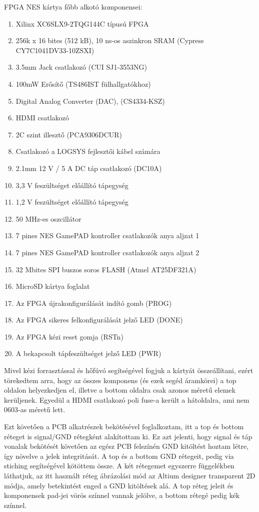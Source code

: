 	FPGA NES kártya főbb alkotó komponensei:
	\begin{enumerate}
		\item Xilinx XC6SLX9-2TQG144C típusú FPGA
		\item 256k x 16 bites (512 kB), 10 ns-os aszinkron SRAM (Cypress CY7C1041DV33-10ZSXI)
		\item 3.5mm Jack csatlakozó (CUI SJ1-3553NG)
		\item 100mW Erősítő (TS486IST fülhallgatókhoz)
		\item Digital Analog Converter (DAC), (CS4334-KSZ)
		\item HDMI csatlakozó
		\item 2C szint illesztő (PCA9306DCUR)
		\item Csatlakozó a LOGSYS fejlesztői kábel számára
		\item 2.1mm 12 V / 5 A DC táp csatlakozó (DC10A)
		\item 3,3 V feszültséget előállító tápegység
		\item 1,2 V feszültséget előállító tápegység
		\item 50 MHz-es oszcillátor 
		\item 7 pines NES GamePAD kontroller csatlakozók anya aljzat 1
		\item 7 pines NES GamePAD kontroller csatlakozók anya aljzat 2
		\item 32 Mbites SPI buszos soros FLASH (Atmel AT25DF321A)
		\item MicroSD kártya foglalat
		\item Az FPGA újrakonfigurálását indító gomb (PROG)
		\item Az FPGA sikeres felkonfigurálását jelző LED (DONE)
		\item Az FPGA kézi reset gomja (RSTn)
		\item A bekapcsolt tápfeszültséget jelző LED (PWR)
	\end{enumerate}
	
	Mivel kézi forrasztással és hőfúvó segítségével fogjuk a kártyát összeállítani, ezért törekedtem arra, hogy az összes komponens (és ezek segéd áramkörei) a top oldalon helyezkedjen el, illetve a bottom oldalra csak azonos méretű elemek kerüljenek. Egyedül a HDMI csatlakozó poli fuse-a került a hátoldalra, ami nem 0603-as méretű lett.
	
	Ezt követően a PCB alkatrészek bekötésével foglalkoztam, itt a top és bottom réteget is signal/GND rétegként alakítottam ki. Ez azt jelenti, hogy signal és táp vonalak bekötését követően az egész PCB felszínén GND kitöltést hoztam létre, így növelve a jelek integritását. A top és a bottom GND rétegeit, pedig via stiching segítségével kötöttem össze. A két rétegemet egyszerre  függelékben láthatjuk, az itt használt réteg ábrázolási mód az Altium designer transparent 2D módja, amely betekintést enged a GND kitöltések alá. A top réteg jeleit és komponensek pad-jei vörös színnel vannak jelölve, a bottom rétegé pedig kék színnel.
	
